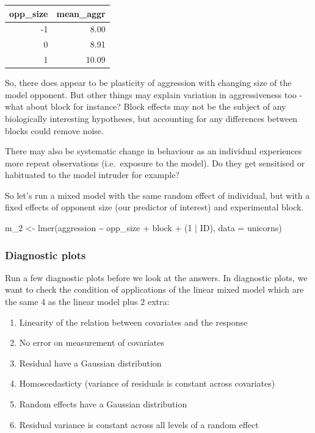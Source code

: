 \documentclass[
  12pt,
]{book}
\newenvironment{Shaded}{\begin{snugshade}}{\end{snugshade}}
\newcommand{\AttributeTok}[1]{\textcolor[rgb]{0.77,0.63,0.00}{#1}}
\newcommand{\DecValTok}[1]{\textcolor[rgb]{0.00,0.00,0.81}{#1}}
\newcommand{\FunctionTok}[1]{\textcolor[rgb]{0.00,0.00,0.00}{#1}}
\newcommand{\NormalTok}[1]{#1}
\newcommand{\OtherTok}[1]{\textcolor[rgb]{0.56,0.35,0.01}{#1}}
\newcommand{\SpecialCharTok}[1]{\textcolor[rgb]{0.00,0.00,0.00}{#1}}
\begin{document}
\begin{tabular}{r|r}
\hline
opp\_size & mean\_aggr\\
\hline
-1 & 8.00\\
\hline
0 & 8.91\\
\hline
1 & 10.09\\
\hline
\end{tabular}

So, there does appear to be plasticity of aggression with changing size of the model opponent. But other things may explain variation in aggressiveness too - what about block for instance? Block effects may not be the subject of any biologically interesting hypotheses, but accounting for any differences between blocks could remove noise.

There may also be systematic change in behaviour as an individual experiences more repeat observations (i.e.~exposure to the model). Do they get sensitised or habituated to the model intruder for example?

So let's run a mixed model with the same random effect of individual, but with a fixed effects of opponent size (our predictor of interest) and experimental block.

\begin{Shaded}
\begin{Highlighting}[]
\NormalTok{m\_2 }\OtherTok{\textless{}{-}} \FunctionTok{lmer}\NormalTok{(aggression }\SpecialCharTok{\textasciitilde{}}\NormalTok{ opp\_size }\SpecialCharTok{+}\NormalTok{ block }\SpecialCharTok{+}\NormalTok{ (}\DecValTok{1} \SpecialCharTok{|}\NormalTok{ ID), }\AttributeTok{data =}\NormalTok{ unicorns)}
\end{Highlighting}
\end{Shaded}

\hypertarget{diagnostic-plots}{%
\subsubsection{Diagnostic plots}\label{diagnostic-plots}}

Run a few diagnostic plots before we look at the answers. In diagnostic plots, we want to check the condition of applications of the linear mixed model which are the same 4 as the linear model plus 2 extra:

\begin{enumerate}
\def\labelenumi{\arabic{enumi}.}
\item
  Linearity of the relation between covariates and the response
\item
  No error on measurement of covariates
\item
  Residual have a Gaussian distribution
\item
  Homoscedasticty (variance of residuals is constant across covariates)
\item
  Random effects have a Gaussian distribution
\item
  Residual variance is constant across all levels of a random effect
\end{enumerate}
\end{document}
